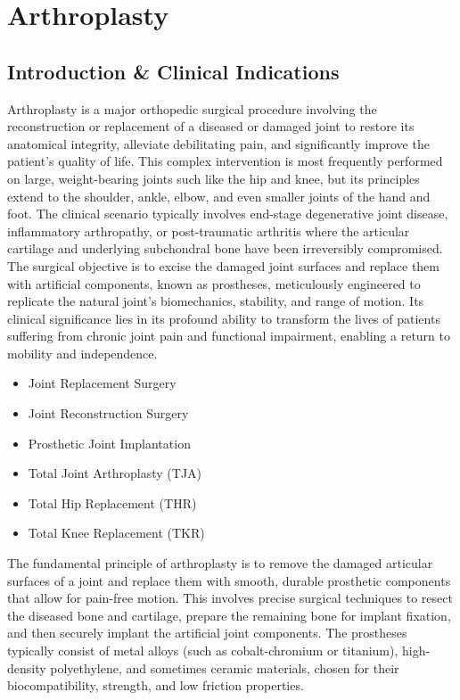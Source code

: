 \chapter{Arthroplasty}

\section*{Introduction \& Clinical Indications}
Arthroplasty is a major orthopedic surgical procedure involving the reconstruction or replacement of a diseased or damaged joint to restore its anatomical integrity, alleviate debilitating pain, and significantly improve the patient's quality of life. This complex intervention is most frequently performed on large, weight-bearing joints such like the hip and knee, but its principles extend to the shoulder, ankle, elbow, and even smaller joints of the hand and foot. The clinical scenario typically involves end-stage degenerative joint disease, inflammatory arthropathy, or post-traumatic arthritis where the articular cartilage and underlying subchondral bone have been irreversibly compromised. The surgical objective is to excise the damaged joint surfaces and replace them with artificial components, known as prostheses, meticulously engineered to replicate the natural joint's biomechanics, stability, and range of motion. Its clinical significance lies in its profound ability to transform the lives of patients suffering from chronic joint pain and functional impairment, enabling a return to mobility and independence.

\begin{itemize}
  \item Joint Replacement Surgery
  \item Joint Reconstruction Surgery
  \item Prosthetic Joint Implantation
  \item Total Joint Arthroplasty (TJA)
  \item Total Hip Replacement (THR)
  \item Total Knee Replacement (TKR)
\end{itemize}

The fundamental principle of arthroplasty is to remove the damaged articular surfaces of a joint and replace them with smooth, durable prosthetic components that allow for pain-free motion. This involves precise surgical techniques to resect the diseased bone and cartilage, prepare the remaining bone for implant fixation, and then securely implant the artificial joint components. The prostheses typically consist of metal alloys (such as cobalt-chromium or titanium), high-density polyethylene, and sometimes ceramic materials, chosen for their biocompatibility, strength, and low friction properties.

